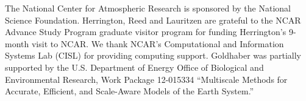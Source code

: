 \documentclass{agujournal}
\begin{document}
{%




%
%
%
%
%
%
%


\acknowledgments
The National Center for Atmospheric Research is sponsored by the National Science Foundation. Herrington, Reed and Lauritzen are grateful to the NCAR Advance Study Program graduate visitor program for funding Herrington's 9-month visit to NCAR. We thank NCAR's Computational and Information Systems Lab (CISL) for providing computing support. Goldhaber was partially supported by the U.S. Department of Energy Office of Biological and Environmental Research, Work Package 12-015334 ``Multiscale Methods for Accurate, Efficient, and Scale-Aware Models of the Earth System.''







}
\end{document}

